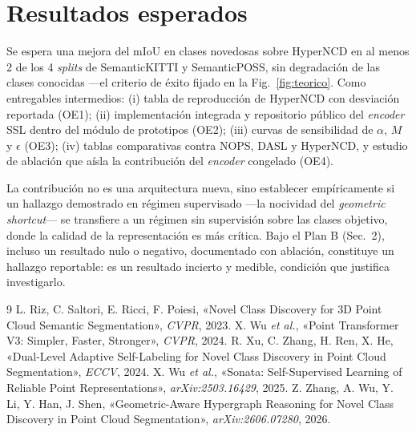 \documentclass[9.5pt,twocolumn,a4paper]{article}
\begin{document}
\section{Resultados esperados}
Se espera una mejora del mIoU en clases novedosas sobre HyperNCD en al menos
2 de los 4 \emph{splits} de SemanticKITTI y SemanticPOSS, sin degradación de
las clases conocidas ---el criterio de éxito fijado en la Fig.~\ref{fig:teorico}.
Como entregables intermedios: (i) tabla de reproducción de HyperNCD con
desviación reportada (OE1); (ii) implementación integrada y repositorio
público del \emph{encoder} SSL dentro del módulo de prototipos (OE2); (iii)
curvas de sensibilidad de $\alpha$, $M$ y $\epsilon$ (OE3); (iv) tablas
comparativas contra NOPS, DASL y HyperNCD, y estudio de ablación que aísla la
contribución del \emph{encoder} congelado (OE4).

La contribución no es una arquitectura nueva, sino establecer empíricamente
si un hallazgo demostrado en régimen supervisado ---la nocividad del
\emph{geometric shortcut}--- se transfiere a un régimen sin supervisión sobre
las clases objetivo, donde la calidad de la representación es más crítica.
Bajo el Plan B (Sec.~2), incluso un resultado nulo o negativo, documentado
con ablación, constituye un hallazgo reportable: es un resultado incierto y
medible, condición que justifica investigarlo.

{\small
\begin{thebibliography}{9}
 L. Riz, C. Saltori, E. Ricci, F. Poiesi, «Novel Class
Discovery for 3D Point Cloud Semantic Segmentation», \emph{CVPR}, 2023.
 X. Wu \emph{et al.}, «Point Transformer V3: Simpler, Faster,
Stronger», \emph{CVPR}, 2024.
 R. Xu, C. Zhang, H. Ren, X. He, «Dual-Level Adaptive
Self-Labeling for Novel Class Discovery in Point Cloud Segmentation»,
\emph{ECCV}, 2024.
 X. Wu \emph{et al.}, «Sonata: Self-Supervised Learning of
Reliable Point Representations», \emph{arXiv:2503.16429}, 2025.
 Z. Zhang, A. Wu, Y. Li, Y. Han, J. Shen, «Geometric-Aware
Hypergraph Reasoning for Novel Class Discovery in Point Cloud Segmentation»,
\emph{arXiv:2606.07280}, 2026.
\end{thebibliography}}




\end{document}
